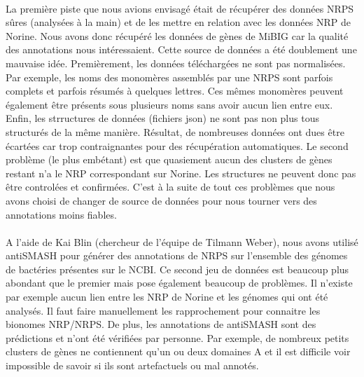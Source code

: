 \documentclass[12pt,french,twoside]{report}
\begin{document}
\paragraph{}La première piste que nous avions envisagé était de récupérer des données NRPS sûres (analysées à la main) et de les mettre en relation avec les données NRP de Norine.
Nous avons donc récupéré les données de gènes de MiBIG car la qualité des annotations nous intéressaient.
Cette source de données a été doublement une mauvaise idée.
Premièrement, les données téléchargées ne sont pas normalisées.
Par exemple, les noms des monomères assemblés par une NRPS sont parfois complets et parfois résumés à quelques lettres.
Ces mêmes monomères peuvent également être présents sous plusieurs noms sans avoir aucun lien entre eux.
Enfin, les strructures de données (fichiers json) ne sont pas non plus tous structurés de la même manière.
Résultat, de nombreuses données ont dues être écartées car trop contraignantes pour des récupération automatiques.
Le second problème (le plus embétant) est que quasiement aucun des clusters de gènes restant n'a le NRP correspondant sur Norine.
Les structures ne peuvent donc pas être controlées et confirmées.
C'est à la suite de tout ces problèmes que nous avons choisi de changer de source de données pour nous tourner vers des annotations moins fiables.

\paragraph{}A l'aide de Kai Blin (chercheur de l'équipe de Tilmann Weber), nous avons utilisé antiSMASH pour générer des annotations de NRPS sur l'ensemble des génomes de bactéries présentes sur le NCBI.
Ce second jeu de données est beaucoup plus abondant que le premier mais pose également beaucoup de problèmes.
Il n'existe par exemple aucun lien entre les NRP de Norine et les génomes qui ont été analysés.
Il faut faire manuellement les rapprochement pour connaitre les bionomes NRP/NRPS.
De plus, les annotations de antiSMASH sont des prédictions et n'ont été vérifiées par personne.
Par exemple, de nombreux petits clusters de gènes ne contiennent qu'un ou deux domaines A et il est difficile voir impossible de savoir si ils sont artefactuels ou mal annotés.
\end{document}
